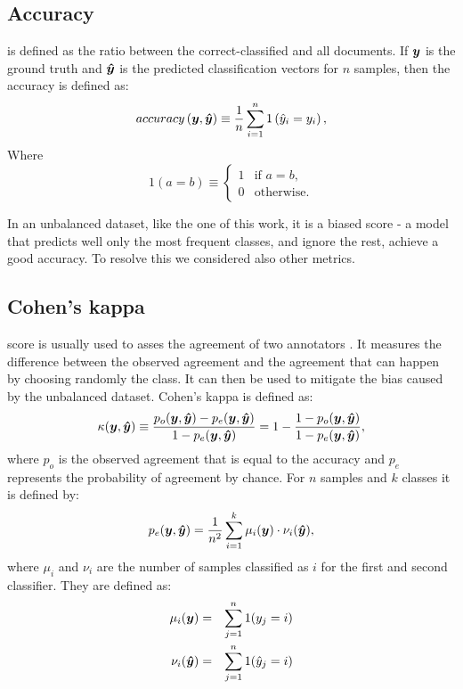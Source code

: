 \subsection{Accuracy}
is defined
as the ratio between the correct-classified and all documents. If $\bm{y}$
is the ground truth and $\bm{\hat y}$ is the predicted
classification vectors for $n$ samples, then the accuracy is defined
as:
\begin{equation*}
  accuracy\left(\bm{y}, \bm{\hat y}\right) \equiv
  \frac{1}{n}\sum_{i=1}^{n} 1\left(\hat y_i = y_i\right),
\end{equation*}
Where
\begin{equation*}
  1(a = b)\equiv
  \begin{cases}
    1 & \text{if }a = b,\\
    0 & \text{otherwise}.
  \end{cases}
\end{equation*}

In an
unbalanced dataset, like the one of this work, it is a biased score -
a model that predicts well only the most frequent classes, and ignore
the rest, achieve a good accuracy. To resolve this we considered also
other metrics.

\subsection{Cohen's kappa} score is usually used to asses
the agreement of two annotators \cite{cohen_coefficient_1960}. It
measures the difference between the observed agreement and the
agreement that can happen by choosing randomly the class. It can then
be used to mitigate the bias caused by the unbalanced dataset. Cohen's
kappa is defined as:
\begin{equation*}
  \kappa(\bm{y}, \bm{\hat y})\equiv \frac{p_o(\bm{y}, \bm{\hat y}) -p_e(\bm{y}, \bm{\hat y})}{1-p_e(\bm{y}, \bm{\hat y})} = 1-\frac{1-p_o(\bm{y}, \bm{\hat y})}{1-p_e(\bm{y}, \bm{\hat y})},
\end{equation*}
where $p_o$ is the observed agreement that is equal to the accuracy
and $p_e$ represents the probability of agreement by chance. For $n$
samples and $k$ classes it is
defined by:
\begin{equation*}
  p_e(\bm{y}, \bm{\hat y}) = \frac{1}{n^2}\sum_{i=1}^{k} \mu_{i}(\bm{y})\cdot\nu_{i}(\bm{\hat y}),
\end{equation*}
where $\mu_{i}$ and $\nu_{i}$ are the number of samples classified as
$i$ for the first and second classifier. They are defined as:
\begin{eqnarray*}
  \mu_i(\bm{y}) &=& \sum_{j=1}^{n}1(y_j = i)\\
  \nu_i(\bm{\hat y}) &=& \sum_{j=1}^{n}1(\hat y_j = i)
\end{eqnarray*}

